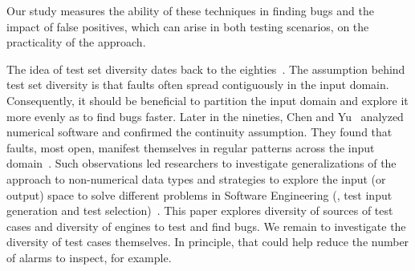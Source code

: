 \documentclass[sigconf,review, anonymous]{acmart}
\begin{document}
Our study measures the ability of these techniques in finding bugs and
the impact of false positives, which can arise in both testing
scenarios, on the practicality of the approach.



The idea of test set diversity dates back to the
eighties~\cite{white-cohen-tse1980, ostrand-balcer-1988}. The
assumption behind test set diversity is that faults often spread
contiguously in the input domain. Consequently, it should be
beneficial to partition the input domain and explore it more evenly as
to find bugs faster. Later in the nineties, Chen and
Yu~\cite{chen-yu-tse1996} analyzed numerical software and confirmed
the continuity assumption. They found that faults, most open, manifest
themselves in regular patterns across the input
domain~\cite{Chen:2010:ART:1663656.1663914,7515474}.  Such
observations led researchers to investigate generalizations of the
approach to non-numerical data types and strategies to explore the
input (or output) space to solve different problems in Software
Engineering (\eg{}, test input generation and test
selection)~\cite{mayer-ase2005,bueno-etal-ase2007,ciupa-etal-icse08,alshahwan-harman-icse2012,alshahwan-harman-issta2014,7515474}. This
paper explores diversity of sources of test cases and diversity of
engines to test and find bugs. We remain to investigate the diversity
of test cases themselves. In principle, that could help reduce the
number of alarms to inspect, for example.
\end{document}
